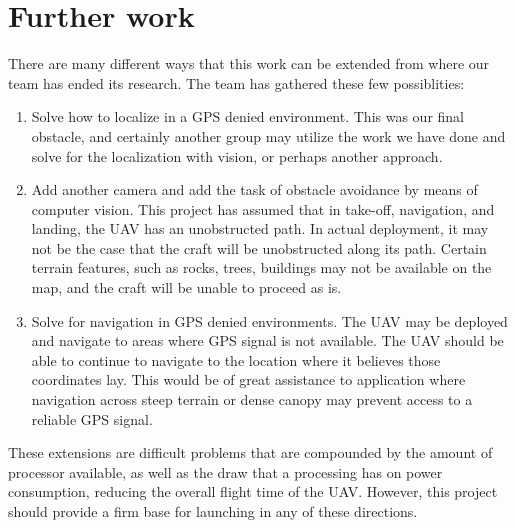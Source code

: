 \section{Further work}  
There are many different ways that this work can be extended from where our team has ended its research. The team has gathered these few possiblities:
\begin{enumerate}
\item Solve how to localize in a GPS denied environment. This was our final obstacle, and certainly another group may utilize the work we have done and solve for the localization with vision, or perhaps another approach.
\item Add another camera and add the task of obstacle avoidance by means of computer vision. This project has assumed that in take-off, navigation, and landing, the UAV has an unobstructed path. In actual deployment, it may not be the case that the craft will be unobstructed along its path. Certain terrain features, such as rocks, trees, buildings may not be available on the map, and the craft will be unable to proceed as is.
\item Solve for navigation in GPS denied environments. The UAV may be deployed and navigate to areas where GPS signal is not available. The UAV should be able to continue to navigate to the location where it believes those coordinates lay. This would be of great assistance to application where navigation across steep terrain or dense canopy may prevent access to a reliable GPS signal.
\end{enumerate}

These extensions are difficult problems that are compounded by the amount of processor available, as well as the draw that a processing has on power consumption, reducing the overall flight time of the UAV. However, this project should provide a firm base for launching in any of these directions.